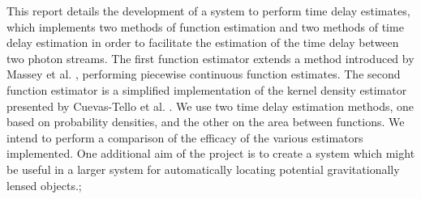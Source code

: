 \documentclass[a4paper,11pt]{article}
\begin{document}
  This report details the development of a system to perform time delay
  estimates, which implements two methods of function estimation and two methods
  of time delay estimation in order to facilitate the estimation of the time
  delay between two photon streams. The first function estimator extends a
  method introduced by Massey et al. \cite{massey1996estimating}, performing
  piecewise continuous function estimates. The second function estimator is a
  simplified implementation of the kernel density estimator presented by
  Cuevas-Tello et al. \cite{cuevas2006accurate}. We use two time delay
  estimation methods, one based on probability densities, and the other on the
  area between functions. We intend to perform a comparison of the efficacy of
  the various estimators implemented. One additional aim of the project is to
  create a system which might be useful in a larger system for automatically
  locating potential gravitationally lensed objects.;

\end{document}
